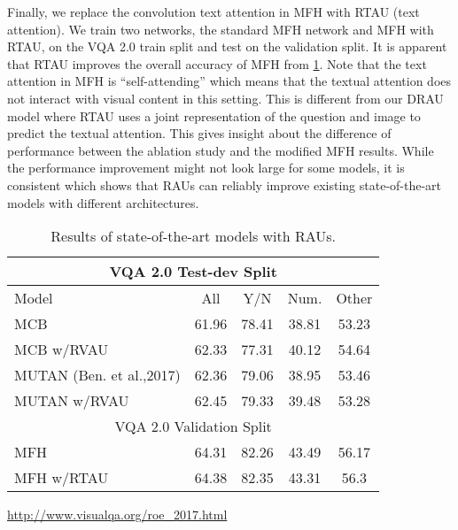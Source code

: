 \documentclass[times,twocolumn, final ,authoryear]{elsarticle}
\begin{document}
Finally, we replace the convolution text attention in MFH with RTAU (text attention). We train two networks, the standard MFH network and MFH with RTAU, on the VQA 2.0 train split and test on the validation split. It is apparent that RTAU improves the overall accuracy of MFH from \cref{tab:mcb_rvau}. Note that the text attention in MFH is ``self-attending'' which means that the textual attention does not
	interact with visual content in this setting. This is different from our DRAU model where RTAU uses a joint representation of the question and image to predict the textual attention. This gives insight about the difference of performance between the ablation study and the modified MFH results. While the performance improvement might not look large for some models, it is consistent which shows that RAUs can reliably improve existing state-of-the-art models with different architectures.

\begin{table}[tbph]
	\center
	\begin{threeparttable}
		
		\caption{Results of state-of-the-art models with RAUs.}
		\begin{tabular}[t]{lcccc}
			\toprule
			
			\multicolumn{5}{c}{VQA 2.0 Test-dev Split} \\
			\midrule
			Model                           & All   & Y/N   & Num.  & Other \\
			\cmidrule(r){1-1}       \cmidrule(l){2-2}  \cmidrule(l){3-5}
			MCB \citep{fukui2016} \tnote{2} & 61.96 & 78.41 & 38.81 & 53.23 \\ %
			MCB w/RVAU                      & 62.33 & 77.31 & 40.12 & 54.64 \\
			\midrule
			MUTAN (Ben. et al.,2017)        & 62.36 & 79.06 & 38.95 & 53.46 \\ %
			MUTAN w/RVAU                    & 62.45 & 79.33 & 39.48 & 53.28 \\
			\bottomrule
			\multicolumn{5}{c}{VQA 2.0 Validation Split} \\
			
			\cmidrule(r){1-1}       \cmidrule(l){2-2}  \cmidrule(l){3-5}
			MFH  \citep{yu2017}             & 64.31 & 82.26 & 43.49 & 56.17 \\ %
			MFH w/RTAU                      & 64.38 & 82.35 & 43.31 & 56.3  \\
			
			
			\bottomrule
		\end{tabular}
		\begin{tablenotes}
			\item[2] \footnotesize \url{http://www.visualqa.org/roe_2017.html}
		\end{tablenotes}
	\end{threeparttable}
	\vspace{0.3cm}
	\label{tab:mcb_rvau}
\end{table}
\end{document}
